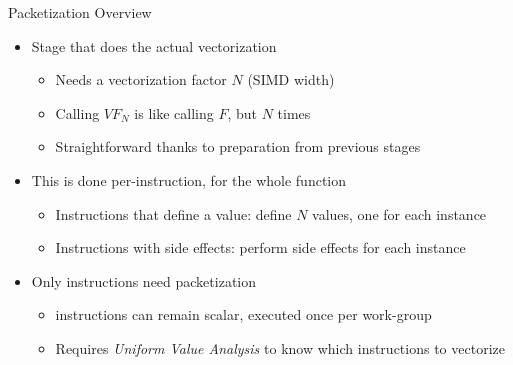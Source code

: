 

\begin{frame}{Packetization Overview}

\begin{itemize}
    \item Stage that does the actual vectorization
    \begin{itemize}
        \item Needs a vectorization factor $N$ (SIMD width)
        \item Calling $VF_N$ is like calling $F$, but $N$ times
        \item Straightforward thanks to preparation from previous stages
    \end{itemize}
    
    \item This is done per-instruction, for the whole function
    \begin{itemize}
        \item Instructions that define a value: define $N$ values, one for each instance
        \item Instructions with side effects: perform side effects for each instance
    \end{itemize}
    
    \item Only  instructions need packetization
    \begin{itemize}
        \item {} instructions can remain scalar, executed once per work-group
        \item Requires \emph{Uniform Value Analysis} to know which instructions to vectorize
    \end{itemize}
    
\end{itemize}

\end{frame}


